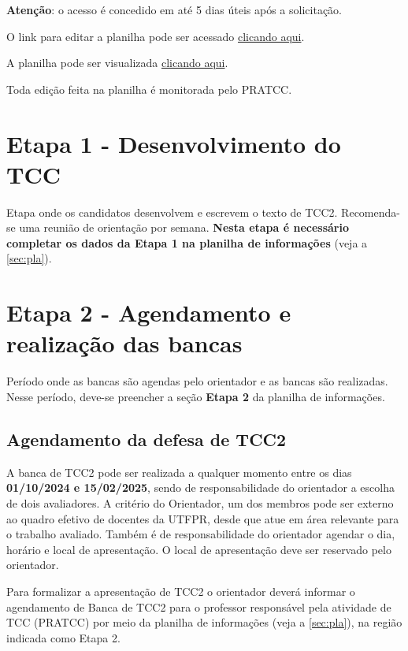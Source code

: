 \documentclass[a4paper, 12pt]{article}
\newcommand{\startdate}{01/10/2024}		%
\newcommand{\bancadate}{15/02/2025}		%
\begin{document}
	\textbf{Atenção}: o acesso é concedido em até 5 dias úteis após a solicitação.
	
	O link para editar a planilha pode ser acessado \href{https://docs.google.com/spreadsheets/d/1kvA48JsgkLEdtAHvRgQ_IDVJ_20ch6-fIN_75WXXCfA/edit?usp=sharing}{clicando aqui}.
	
	A planilha pode ser visualizada \href{https://docs.google.com/spreadsheets/d/e/2PACX-1vRBVzCBFvFwd0x0fgkgbf2qIa7ubVvVlpGffdX8YjB73VHXoW492Vf9BC0-FdDoz8Xm2ngQCqe_pHM-/pubhtml}{clicando aqui}.

	Toda edição feita na planilha é monitorada pelo PRATCC.

	\section{Etapa 1 - Desenvolvimento do TCC}
	\label{sec:et1}
	Etapa onde os candidatos desenvolvem e escrevem o texto de TCC2. Recomenda-se uma reunião de orientação por semana. \textbf{Nesta etapa é necessário completar os dados da Etapa 1 na planilha de informações} (veja a \autoref{sec:pla}).

    \section{Etapa 2 - Agendamento e realização das bancas}
	\label{sec:et2}

	Período onde as bancas são agendas pelo orientador e as bancas são realizadas. Nesse período, deve-se preencher a seção \textbf{Etapa 2} da planilha de informações.
   	
	\subsection{Agendamento da defesa de TCC2}

    A banca de TCC2 pode ser realizada a qualquer momento entre os dias \textbf{\startdate{} e \bancadate{}}, sendo de responsabilidade do orientador a escolha de dois avaliadores. A critério do Orientador, um dos membros pode ser externo ao quadro efetivo de docentes da UTFPR, desde que atue em área relevante para o trabalho avaliado. Também é de responsabilidade do orientador agendar o dia, horário e local de apresentação. O local de apresentação deve ser reservado pelo orientador.
    
    Para formalizar a apresentação de TCC2 o orientador deverá informar o agendamento de Banca de TCC2 para o professor responsável pela atividade de TCC (PRATCC) por meio da planilha de informações (veja a \autoref{sec:pla}), na região indicada como Etapa 2.
    
\end{document}
